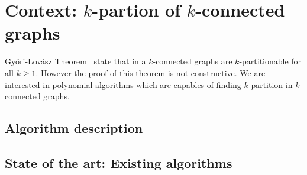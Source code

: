 \section{Context: $k$-partion of $k$-connected graphs}
Gy{\H o}ri-Lovász Theorem~\cite{GE78,LL77} state that in a $k$-connected graphs are 
$k$-partitionable for all $k \geq 1$. However the proof of this theorem
is not constructive. We are interested in polynomial algorithms which
are capables of finding $k$-partition in $k$-connected graphs.

\subsection{Algorithm description}


\subsection{State of the art: Existing algorithms}

